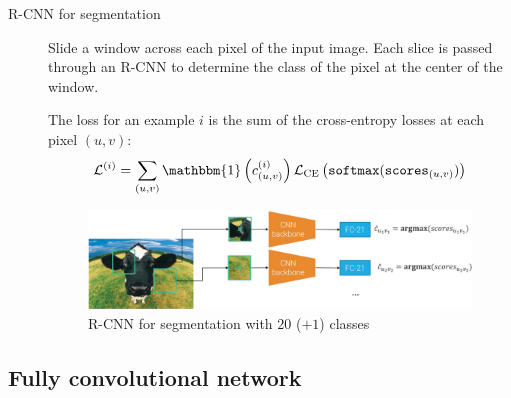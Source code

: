 \begin{description}
    \item[R-CNN for segmentation] 
        Slide a window across each pixel of the input image. Each slice is passed through an R-CNN to determine the class of the pixel at the center of the window.

        The loss for an example $i$ is the sum of the cross-entropy losses at each pixel $(u, v)$:
        \[ \mathcal{L}^{(i)} = \sum_{(u, v)} \mathbbm{1}\left( c_{(u, v)}^{(i)} \right) \mathcal{L}_\text{CE}\left( \texttt{softmax}(\texttt{scores}_{(u, v)}) \right) \]

        \begin{figure}[H]
            \centering
            \includegraphics[width=0.9\linewidth]{./img/_segmentation_rcnn.jpg}
            \caption{R-CNN for segmentation with $20$ ($+1$) classes}
        \end{figure}
\end{description}


\subsection{Fully convolutional network}

